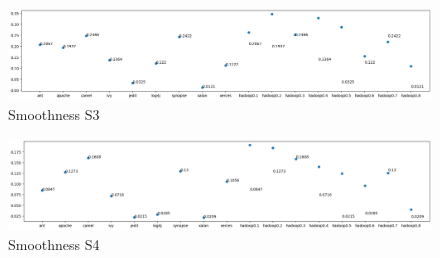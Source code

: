 \begin{figure}[h!]
    \includegraphics[width=\textwidth]{figures/smoothness-S3.png}
    \caption{Smoothness S3}
    \label{fig:smoothness-s3-big}
\end{figure}

\begin{figure}[h!]
    \includegraphics[width=\textwidth]{figures/smoothness-S4.png}
    \caption{Smoothness S4}
    \label{fig:smoothness-s4-big}
\end{figure}
